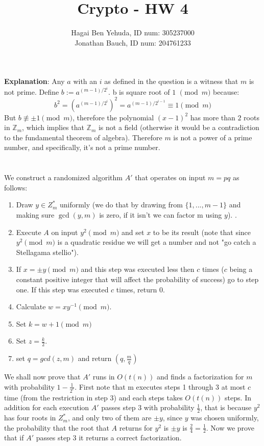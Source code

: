 \documentclass{article}
\title{Crypto - HW 4}
\author{Hagai Ben Yehuda, ID num: 305237000\\ Jonathan Bauch, ID num: 204761233}
\date{}
\begin{document}
  \maketitle

\section{} %


\textbf{Explanation}: Any $a$ with an $i$ as defined in the question is a witness that $m$ is not prime. Define $b := a^{(m-1)/2^i}$.
b is square  root of $1$ $\pmod{m}$ because:
\[ b^2 = (a^{(m-1)/2^i})^2 = a^{(m-1)/2^{i-1}} \equiv 1 \pmod{m} \]
But $b \not \equiv \pm 1 \pmod{m}$, therefore the polynomial $(x-1)^2$ has more than $2$ roots in $\mathbb{Z}_m$, which implies that $\mathbb{Z}_m$ is not a field (otherwise it would be a contradiction to the fundamental theorem of algebra). Therefore $m$ is not a power of a prime number, and specifically, it's not a prime number. 

\section{} %
We construct a randomized algorithm $A'$ that operates on input $m = pq$ as follows:
\begin{enumerate}
\item Draw $y\in Z_{m}^{*}$ uniformly (we do that by drawing from $\{1,...,m-1\}$ and making sure $\gcd(y,m)$ is zero, if it isn't we can factor m using $y$). .
\item Execute $A$ on input $y^2 \pmod m $ and set $x$ to be its result (note that since $y^2 \pmod m $ is a quadratic residue we will get a number and not  "go catch a Stellagama stellio"). 
\item If $x = \pm y \pmod m$ and this step was executed less then $c$ times ($c$ being a constant positive integer that will affect the probability of success) go to step one. If this step was executed $c$ times, return $0$.
\item Calculate $w = x  y^{-1} \pmod m$.
\item Set $k = w+1 \pmod m$ 
\item Set $z = \frac{k}{2}$.
\item set $q = gcd(z, m)$ and return $(q, \frac{m}{q})$
\end{enumerate} 
We shall now prove that $A'$ runs in $O(t(n))$ and finds a factorization for $m$ with probability $ 1- \frac{1}{2^c}$.
First note that m executes steps 1 through 3 at most $c$ time (from the restriction in step 3) and each steps takes $O(t(n))$ steps.
In addition for each execution $A'$ passes step $3$ with probability $\frac{1}{2}$, that is because $y^2$ has four roots in $Z_{m}^{*}$, and only two of them are $\pm y$, since $y$ was chosen uniformly, the probability that the root that $A$ returns for $y^2$ is $ \pm y$  is  $\frac{2}{4} = \frac{1}{2}$.
Now we prove that if $A'$ passes step 3 it returns a correct factorization.
\end{document}
